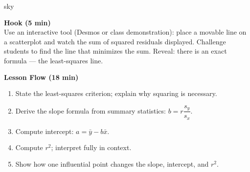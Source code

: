 \documentclass[10pt]{article}
\begin{document}
\begin{skillbox}{sky}
\begin{minipage}[t]{0.48\linewidth}
    \textbf{Hook (5 min)}\\
    Use an interactive tool (Desmos or class demonstration): place a movable line on a scatterplot and watch the sum of squared residuals displayed. Challenge students to find the line that minimizes the sum. Reveal: there is an exact formula --- the least-squares line.
\end{minipage}
\hfill
\begin{minipage}[t]{0.48\linewidth}
    \textbf{Lesson Flow (18 min)}
    \begin{enumerate}
        \item State the least-squares criterion; explain why squaring is necessary.
        \item Derive the slope formula from summary statistics: $b = r\dfrac{s_y}{s_x}$.
        \item Compute intercept: $a = \bar{y} - b\bar{x}$.
        \item Compute $r^2$; interpret fully in context.
        \item Show how one influential point changes the slope, intercept, and $r^2$.
    \end{enumerate}
\end{minipage}
\end{skillbox}
\end{document}
